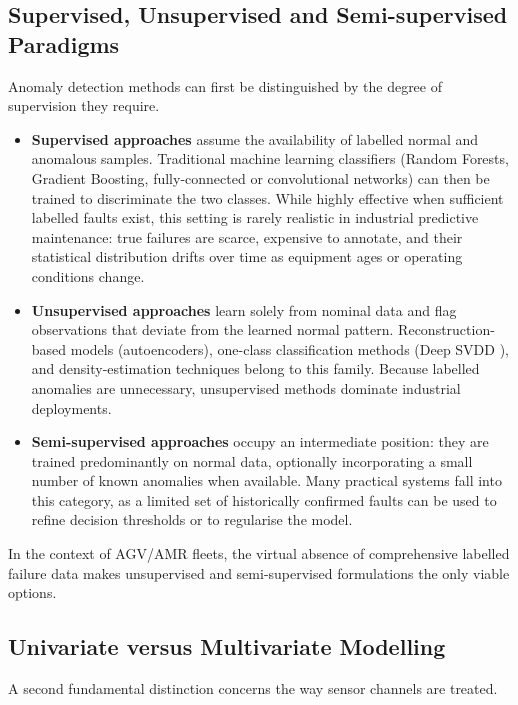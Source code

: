 \subsection{Supervised, Unsupervised and Semi-supervised Paradigms}

Anomaly detection methods can first be distinguished by the degree of supervision they require.

\begin{itemize}
    \item \textbf{Supervised approaches} assume the availability of labelled normal and anomalous samples.
    Traditional machine learning classifiers (Random Forests, Gradient Boosting, fully-connected or convolutional networks) can then be trained to discriminate the two classes.
    While highly effective when sufficient labelled faults exist, this setting is rarely realistic in industrial predictive maintenance: true failures are scarce, expensive to annotate, and their statistical distribution drifts over time as equipment ages or operating conditions change.
    
    \item \textbf{Unsupervised approaches} learn solely from nominal data and flag observations that deviate from the learned normal pattern.
    Reconstruction-based models (autoencoders), one-class classification methods (Deep SVDD \cite{pmlr-v80-ruff18a}), and density-estimation techniques belong to this family.
    Because labelled anomalies are unnecessary, unsupervised methods dominate industrial deployments.
    
    \item \textbf{Semi-supervised approaches} occupy an intermediate position: they are trained predominantly on normal data, optionally incorporating a small number of known anomalies when available.
    Many practical systems fall into this category, as a limited set of historically confirmed faults can be used to refine decision thresholds or to regularise the model.
\end{itemize}

In the context of AGV/AMR fleets, the virtual absence of comprehensive labelled failure data makes unsupervised and semi-supervised formulations the only viable options.

\subsection{Univariate versus Multivariate Modelling}

A second fundamental distinction concerns the way sensor channels are treated.

